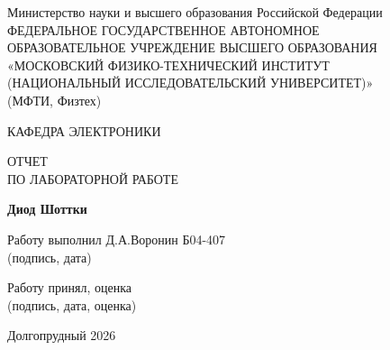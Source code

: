 \documentclass[12pt]{article}
\begin{document}
\thispagestyle{empty}

\begin{center}

\large
Министерство науки и высшего образования Российской Федерации \\
\large
ФЕДЕРАЛЬНОЕ ГОСУДАРСТВЕННОЕ АВТОНОМНОЕ \\
ОБРАЗОВАТЕЛЬНОЕ УЧРЕЖДЕНИЕ ВЫСШЕГО ОБРАЗОВАНИЯ \\
\large
«МОСКОВСКИЙ ФИЗИКО-ТЕХНИЧЕСКИЙ ИНСТИТУТ \\
(НАЦИОНАЛЬНЫЙ ИССЛЕДОВАТЕЛЬСКИЙ УНИВЕРСИТЕТ)» \\
(МФТИ, Физтех)

\vspace{4cm}

\large
КАФЕДРА ЭЛЕКТРОНИКИ

\vspace{0.7cm}

\Large
ОТЧЕТ \\
ПО ЛАБОРАТОРНОЙ РАБОТЕ

\vspace{0.7cm}

\large
\textbf{Диод Шоттки}

\vfill

\noindent
Работу выполнил \hfill \underline{\hspace{6cm}} Д.А.Воронин Б04-407 \\
\hfill \small{(подпись, дата)}\par

\vspace{3cm}

\noindent
Работу принял, оценка \hfill \underline{\hspace{6cm}} \\
\hfill \small{(подпись, дата, оценка)}

\vfill

Долгопрудный 2026

\end{center}



\thispagestyle{empty}
\end{document}
